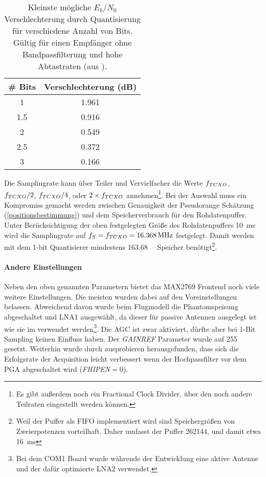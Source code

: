 \begin{table}[htbp]
    \ttabbox
    {
        \caption[$E_b/N_0$ Verschlechterung durch Quantisierung]{Kleinste mögliche $E_b/N_0$ Verschlechterung durch Quantisierung für verschiedene Anzahl von Bits. Gültig für einen Empfänger ohne Bandpassfilterung und hohe Abtastraten (aus \cite{hegarty2011analytical}).}
        \label{TabDegradQuant}
    }
    {
    \begin{tabular}{c c}
        \toprule
        \# Bits             &  Verschlechterung (dB)\\
        \midrule
        \num{1}         & \num{1,961} \\
        \num{1.5}    & \num{0.916} \\
        \num{2}           & \num{0.549} \\
        \num{2.5}    & \num{0.372} \\
        \num{3}           & \num{0.166} \\
        \bottomrule
    \end{tabular}
    }
\end{table}

Die Samplingrate kann über Teiler und Vervielfacher die Werte $f_{TCXO}$, $f_{TCXO}/2$, $f_{TCXO}/4$, oder $2\times f_{TCXO}$ annehmen\footnote{Es gibt außerdem noch ein Fractional Clock Divider, über den noch andere Teilraten eingestellt werden können.}. Bei der Auswahl muss ein Kompromiss gemacht werden zwischen Genauigkeit der Pseudorange Schätzung (\ref{positionsbestimmung}) und dem Speicherverbrauch für den Rohdatenpuffer. Unter Berücksichtigung der oben festgelegten Größe des Rohdatenpuffers \SI{10}{\ms} wird die Samplingrate auf  $f_S=\gpsftcxo=\SI{16.368}{\MHz}$ festgelegt. Damit werden mit dem 1-bit Quantisierer mindestens \SI{163.68}{\kilo\bit} Speicher benötigt\footnote{Weil der Puffer als FIFO implementiert wird sind Speichergrößen von Zweierpotenzen vorteilhaft. Daher umfasst der Puffer \SI{262144}{\bit}, und damit etwa \SI{16}{\ms}}.

\paragraph{Andere Einstellungen} Neben den oben genannten Parametern bietet das MAX2769 Frontend noch viele weitere Einstellungen. Die meisten wurden dabei auf den Voreinstellungen belassen. Abweichend davon wurde beim Flugmodell die Phantomspeisung abgeschaltet und LNA1 ausgewählt, da dieser für passive Antennen ausgelegt ist wie sie im \dscubesat verwendet werden\footnote{Bei dem COM1 Board wurde währende der Entwicklung eine aktive Antenne und der dafür optimierte LNA2 verwendet.}. Die \gls{AGC} ist zwar aktiviert, dürfte aber bei 1-Bit Sampling keinen Einfluss haben. Der \emph{GAINREF} Parameter wurde auf 255 gesetzt. Weiterhin wurde durch ausprobieren herausgefunden, dass sich die Erfolgsrate der Acquisition leicht verbessert wenn der Hochpassfilter vor dem \gls{PGA} abgeschaltet wird (\emph{FHIPEN}$=0$).


